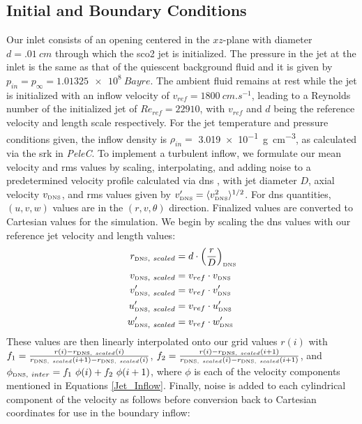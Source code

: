 \subsection{Initial and Boundary Conditions}
Our inlet consists of an opening centered in the $xz$-plane with diameter $d=\SI{.01}{cm}$ through which the \gls{sco2} jet is initialized. The pressure in the jet at the inlet is the same as that of the quiescent background fluid and it is given by $p_{in}=p_{\infty}=\SI{1.01325e+8}{Bayre}$. The ambient fluid remains at rest while the jet is initialized with an inflow velocity of $v_{ref} = \SI{1800}{cm.s^{-1}}$, leading to a Reynolds number of the initialized jet of $Re_{ref} = 22910$, with $v_{ref}$ and $d$ being the reference velocity and length scale respectively. For the jet temperature and pressure conditions given, the inflow density is $\rho_{in}=$ \SI{3.019e-1}{g.cm^{-3}}, as calculated via the \gls{srk} in \textit{PeleC}. To implement a turbulent inflow, we formulate our mean velocity and \gls{rms} values by scaling, interpolating, and adding noise to a predetermined velocity profile calculated via \gls{dns} \cite{DNS}, with jet diameter $D$, axial velocity $v_{\text{\tiny{DNS}}}$, and \gls{rms} values given by $v^{\prime}_{\text{\tiny{DNS}}} =  \langle v_{\text{\tiny{DNS}}}^2 \rangle ^{1/2}$. For \gls{dns} quantities, $(u,v,w)$ values are in the $(r,v,\theta)$ direction. Finalized values are converted to Cartesian values for the simulation. We begin by scaling the \gls{dns} values with our reference jet velocity and length values:
\begin{subequations} \label{Jet_Inflow}
	\begin{align}
		r_{\text{\tiny{DNS}},\ scaled} &= d \cdot \left( \dfrac{r}{D} \right)_{\text{\tiny{DNS}}} \\
		v_{\text{\tiny{DNS}},\ scaled} &=  v_{ref} \cdot v_{\text{\tiny{DNS}}} \\
		v^{\prime}_{\text{\tiny{DNS}},\ scaled} &=  v_{ref} \cdot v^{\prime}_{\text{\tiny{DNS}}} \\
		u^{\prime}_{\text{\tiny{DNS}},\ scaled} &=   v_{ref} \cdot u^{\prime}_{\text{\tiny{DNS}}} \\
		w^{\prime}_{\text{\tiny{DNS}},\ scaled} &=   v_{ref} \cdot w^{\prime}_{\text{\tiny{DNS}}} 
	\end{align}
\end{subequations}  
These values are then linearly interpolated onto our grid values $r(i)$ with $f_1 = \tfrac{r(i) - r_{\text{\tiny{DNS}},\ scaled}(i) }{r_{\text{\tiny{DNS}},\ scaled}(i+1) - r_{\text{\tiny{DNS}},\ scaled}(i)}$, $f_2 = \tfrac{r(i) - r_{\text{\tiny{DNS}},\ scaled}(i+1) }{r_{\text{\tiny{DNS}},\ scaled}(i) - r_{\text{\tiny{DNS}},\ scaled}(i+1)}$, and $\phi_{\text{\tiny{DNS}},\ inter} = f_1\ \phi(i) + f_2\ \phi(i+1)$, where $\phi$ is each of the velocity components mentioned in Equations \ref{Jet_Inflow}. Finally, noise is added to each cylindrical component of the velocity as follows before conversion back to Cartesian coordinates for use in the boundary inflow:
